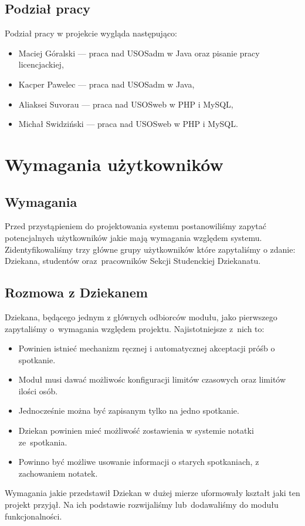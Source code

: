 \documentclass[licencjacka]{pracamgr}
\begin{document}
\section{Podział pracy}
Podział pracy w projekcie wygląda następująco:
\begin{itemize}
\setlength\itemsep{0,05em}
\item Maciej Góralski --- praca nad USOSadm w Java oraz pisanie pracy   licencjackiej,
\item Kacper Pawelec --- praca nad USOSadm w Java,
\item Aliaksei Suvorau --- praca nad USOSweb w PHP i MySQL,
\item Michał Swidziński --- praca  nad USOSweb w PHP i MySQL.
\end{itemize}


\chapter{Wymagania użytkowników} \label{chap:wymagania}

\section{Wymagania}
Przed przystąpieniem do projektowania systemu postanowiliśmy zapytać potencjalnych użytkowników jakie mają wymagania względem systemu. Zidentyfikowaliśmy trzy główne grupy użytkowników które zapytaliśmy o zdanie: Dziekana, studentów oraz~pracowników Sekcji Studenckiej Dziekanatu.

\section{Rozmowa z Dziekanem}
Dziekana, będącego jednym z głównych odbiorców modułu, jako pierwszego zapytaliśmy o~wymagania względem projektu. Najistotniejsze z~nich to:

\begin{itemize}
\setlength\itemsep{0,05em}
\item Powinien istnieć mechanizm ręcznej i automatycznej akceptacji próśb o spotkanie.
\item Moduł musi dawać możliwośc konfiguracji limitów czasowych oraz limitów ilości osób.
\item Jednocześnie można być zapisanym tylko na jedno spotkanie.
\item Dziekan powinien mieć możliwość zostawienia w systemie notatki ze~spotkania.
\item Powinno być możliwe usowanie informacji o starych spotkaniach, z zachowaniem notatek.
\end{itemize}
Wymagania jakie przedstawił Dziekan w dużej mierze uformowały kształt jaki ten projekt przyjął. Na ich podstawie rozwijaliśmy lub~dodawaliśmy do modułu funkcjonalności.
\end{document}
